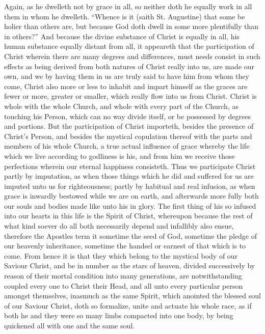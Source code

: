 Again, as he dwelleth not by grace in all, so neither doth he equally work in all them in whom he dwelleth. “Whence is it (saith St. Augustine) that some be holier than others are, but because God doth dwell in some more plentifully than in others?”
And because the divine substance of Christ is equally in all, his human substance equally distant from all, it appeareth that the participation of Christ wherein there are many degrees and differences, must needs consist in such effects as being derived from both natures of Christ really into us, are made our own, and we by having them in us are truly said to have him from whom they come, Christ also more or less to inhabit and impart himself as the graces are fewer or more, greater or smaller, which really flow into us from Christ.
Christ is whole with the whole Church, and whole with every part of the Church, as touching his Person, which can no way divide itself, or be possessed by degrees and portions. But the participation of Christ importeth, besides the presence of Christ’s Person, and besides the mystical copulation thereof with the parts and members of his whole Church, a true actual influence of grace whereby the life which we live according to godliness is his, and from him we receive those perfections wherein our eternal happiness consisteth.
Thus we participate Christ partly by imputation, as when those things which he did and suffered for us are imputed unto us for righteousness; partly by habitual and real infusion, as when grace is inwardly bestowed while we are on earth, and afterwards more fully both our souls and bodies made like unto his in glory. The first thing of his so infused into our hearts in this life is the Spirit of Christ, whereupon because the rest of what kind soever do all both necessarily depend and infallibly also ensue, therefore the Apostles term it sometime the seed of God, sometime the pledge of our heavenly inheritance, sometime the handsel or earnest of that which is to come. From hence it is that they which belong to the mystical body of our Saviour Christ, and be in number as the stars of heaven, divided successively by reason of their mortal condition into many generations, are notwithstanding coupled every one to Christ their Head, and all unto every particular person amongst themselves, inasmuch as the same Spirit, which anointed the blessed soul of our Saviour Christ, doth so formalize, unite and actuate his whole race, as if both he and they were so many limbs compacted into one body, by being quickened all with one and the same soul.
